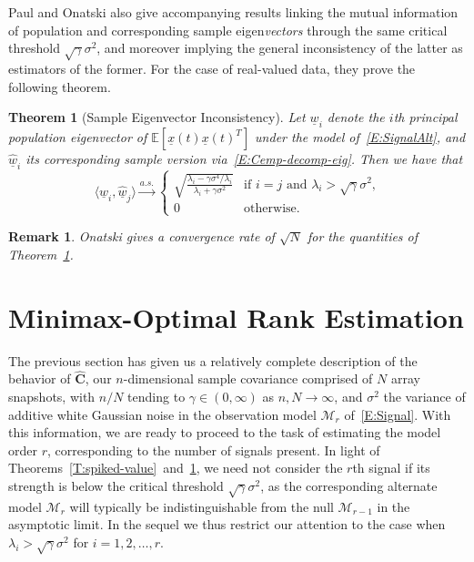 \documentclass[final]{IEEEtran} %
\newtheorem{theorem}{Theorem}
\newtheorem{rem}{Remark}
\newcommand{\vectorsymbol}{\underline}
\newcommand{\matrixsymbol}{\boldsymbol}
\newcommand{\mhC}{\widehat{\matrixsymbol{C}}}
\newcommand{\vw}{\vectorsymbol{w}}
\newcommand{\vhw}{\hat{\vectorsymbol{w}}}
\newcommand{\vx}{\vectorsymbol{x}}
\newcommand{\E}{\mathbb{E}}
\begin{document}
Paul and Onatski also give accompanying results linking the mutual information of population and corresponding sample eigen\emph{vectors} through the same critical threshold $\sqrt{\gamma} \sigma^2$, and moreover implying the general inconsistency of the latter as estimators of the former.  For the case of real-valued data, they prove the following theorem.

\begin{theorem}[Sample Eigenvector Inconsistency]\label{T:spiked-vector}
    Let $\vw_i$ denote the $i$th principal population eigenvector of $\E\left[ \vx(t) \vx(t)^T \right]$ under the model of~\eqref{E:SignalAlt}, and $\vhw_i$ its corresponding sample version via~\eqref{E:Cemp-decomp-eig}.  Then we have that
    \begin{equation*}
        \langle \vw_i, \vhw_j \rangle \overset{a.s.}{\longrightarrow}
        \begin{cases}
            \sqrt{\frac{\lambda_i - \gamma \sigma^4/\lambda_i}
                                   {\lambda_i + \gamma \sigma^2}} & \text{if $i = j$ and $\lambda_i > \sqrt{\gamma} \sigma^2$,} \\
            0 & \text{otherwise.}
        \end{cases}
    \end{equation*}
\end{theorem}
\begin{rem}
Onatski gives a convergence rate of $\sqrt{N}$ for the quantities of Theorem~\ref{T:spiked-vector}.
\end{rem}

\section{Minimax-Optimal Rank Estimation}
\label{S:rank-est}

The previous section has given us a relatively complete description of the behavior of $\mhC$, our $n$-dimensional sample covariance comprised of $N$ array snapshots, with $n/N$ tending to $\gamma \in (0, \infty)$ as $n,N \to \infty$, and $\sigma^2$ the variance of additive white Gaussian noise in the observation model $\mathcal{M}_r$ of~\eqref{E:Signal}.  With this information, we are ready to proceed to the task of estimating the model order $r$, corresponding to the number of signals present.  In light of Theorems~\ref{T:spiked-value}~and~\ref{T:spiked-vector}, we need not consider the $r$th signal if its strength is below the critical threshold $\sqrt{\gamma} \sigma^2$, as the corresponding alternate model $\mathcal{M}_r$ will typically be indistinguishable from the null $\mathcal{M}_{r-1}$ in the asymptotic limit.  In the sequel we thus restrict our attention to the case when $\lambda_i > \sqrt{\gamma} \sigma^2$ for $i = 1, 2, \ldots, r$.
\end{document}
